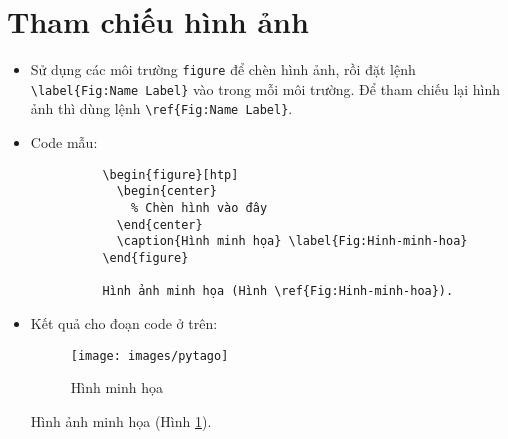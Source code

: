 \documentclass[12pt,a4paper]{article}
\begin{document}
\section{Tham chiếu hình ảnh}
\begin{itemize}
  \item Sử dụng các môi trường \verb|figure| để chèn hình ảnh, rồi đặt lệnh \verb|\label{Fig:Name Label}| vào trong mỗi môi trường. Để tham chiếu lại hình ảnh thì dùng lệnh \verb|\ref{Fig:Name Label}|.
  \item Code mẫu:
        \begin{verbatim}
          \begin{figure}[htp]
            \begin{center}
              % Chèn hình vào đây
            \end{center}
            \caption{Hình minh họa} \label{Fig:Hinh-minh-hoa}
          \end{figure}

          Hình ảnh minh họa (Hình \ref{Fig:Hinh-minh-hoa}).
        \end{verbatim}
  \item Kết quả cho đoạn code ở trên:

        \begin{figure}[!htp]
          \begin{center}
            \texttt{[image: images/pytago]}
          \end{center}
          \caption{Hình minh họa} \label{Fig:Hinh-minh-hoa}
        \end{figure}

        Hình ảnh minh họa (Hình \ref{Fig:Hinh-minh-hoa}).
\end{itemize}
\end{document}
